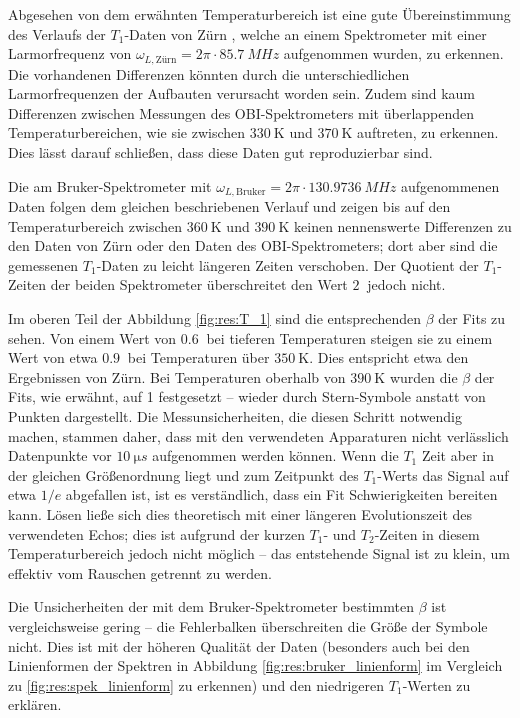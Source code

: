 Abgesehen von dem erwähnten Temperaturbereich ist eine gute Übereinstimmung des Verlaufs der $T_1$-Daten von Zürn \cite{zuern_paper}, welche an einem Spektrometer mit einer Larmorfrequenz von $\omega_{L, \text{Zürn}} = 2\pi \cdot \SI{85.7}{MHz}$ aufgenommen wurden, zu erkennen. Die vorhandenen Differenzen könnten durch die unterschiedlichen Larmorfrequenzen der Aufbauten verursacht worden sein. Zudem sind kaum Differenzen zwischen Messungen des OBI-Spektrometers mit überlappenden Temperaturbereichen, wie sie zwischen $\SI{330}{\kelvin}$ und $\SI{370}{\kelvin}$ auftreten, zu erkennen. Dies lässt darauf schließen, dass diese Daten gut reproduzierbar sind.

Die am Bruker-Spektrometer mit $\omega_{L, \text{Bruker}} = 2\pi \cdot \SI{130.9736}{MHz}$ aufgenommenen Daten folgen dem gleichen beschriebenen Verlauf und zeigen bis auf den Temperaturbereich zwischen $\SI{360}{\kelvin}$ und $\SI{390}{\kelvin}$ keinen nennenswerte Differenzen zu den Daten von Zürn oder den Daten des OBI-Spektrometers; dort aber sind die gemessenen $T_1$-Daten zu leicht längeren Zeiten verschoben. Der Quotient der $T_1$-Zeiten der beiden Spektrometer überschreitet den Wert $\SI{2}{}$ jedoch nicht.

Im oberen Teil der Abbildung \ref{fig:res:T_1} sind die entsprechenden $\beta$ der Fits zu sehen. Von einem Wert von $\SI{0.6}{}$ bei tieferen Temperaturen steigen sie zu einem Wert von etwa $\SI{0.9}{}$ bei Temperaturen über $\SI{350}{\kelvin}$. Dies entspricht etwa den Ergebnissen von Zürn. Bei Temperaturen oberhalb von $\SI{390}{\kelvin}$ wurden die $\beta$ der Fits, wie erwähnt, auf 1 festgesetzt -- wieder durch Stern-Symbole anstatt von Punkten dargestellt. Die Messunsicherheiten, die diesen Schritt notwendig machen, stammen daher, dass mit den verwendeten Apparaturen nicht verlässlich Datenpunkte vor $\SI{10}{\micro s}$ aufgenommen werden können. Wenn die $T_1$ Zeit aber in der gleichen Größenordnung liegt und zum Zeitpunkt des $T_1$-Werts das Signal auf etwa $1/e$ abgefallen ist, ist es verständlich, dass ein Fit Schwierigkeiten bereiten kann. Lösen ließe sich dies theoretisch mit einer längeren Evolutionszeit des verwendeten Echos; dies ist aufgrund der kurzen $T_1$- und $T_2$-Zeiten in diesem Temperaturbereich jedoch nicht möglich -- das entstehende Signal ist zu klein, um effektiv vom Rauschen getrennt zu werden.

Die Unsicherheiten der mit dem Bruker-Spektrometer bestimmten $\beta$ ist vergleichsweise gering -- die Fehlerbalken überschreiten die Größe der Symbole nicht. Dies ist mit der höheren Qualität der Daten (besonders auch bei den Linienformen der Spektren in Abbildung \ref{fig:res:bruker_linienform} im Vergleich zu \ref{fig:res:spek_linienform} zu erkennen) und den niedrigeren $T_1$-Werten zu erklären.



